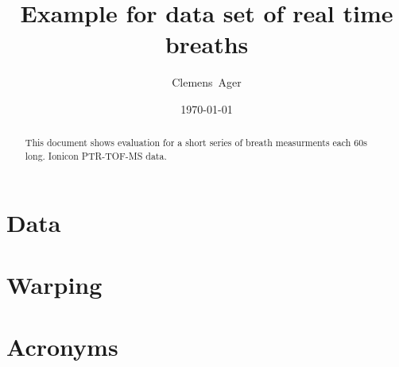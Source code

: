 \documentclass[twocolumn]{article}
\title{Example for data set of real time breaths}
\author{Clemens~Ager}
\date{\today}
\begin{document}
\maketitle

\begin{abstract}
  This document shows evaluation for a short series of breath
  measurments each \si{60}{s} long.
  Ionicon \ac{PTR-TOF-MS} data.  
\end{abstract}


\setcounter{tocdepth}{2}
\tableofcontents

%

\section{Data}
%

\section{Warping}
%

\appendix 
\section{Acronyms}


\printbibliography{}
\end{document}
